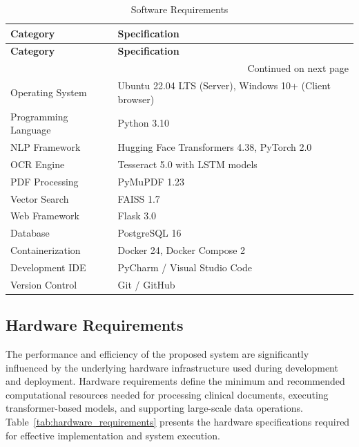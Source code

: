 \begin{longtable}{|p{4.5cm}|p{9cm}|}
\caption{Software Requirements}
\label{tab:software_requirements}\\

\hline
\textbf{Category} &
\textbf{Specification} \\
\hline
\endfirsthead

\hline
\textbf{Category} &
\textbf{Specification} \\
\hline
\endhead

\hline
\multicolumn{2}{r}{Continued on next page} \\
\endfoot

\hline
\endlastfoot


Operating System &
Ubuntu 22.04 LTS (Server), Windows 10+ (Client browser) \\
\hline

Programming Language &
Python 3.10 \\
\hline

NLP Framework &
Hugging Face Transformers 4.38, PyTorch 2.0 \\
\hline

OCR Engine &
Tesseract 5.0 with LSTM models \\
\hline

PDF Processing &
PyMuPDF 1.23 \\
\hline

Vector Search &
FAISS 1.7 \\
\hline

Web Framework &
Flask 3.0 \\
\hline

Database &
PostgreSQL 16 \\
\hline

Containerization &
Docker 24, Docker Compose 2 \\
\hline

Development IDE &
PyCharm / Visual Studio Code \\
\hline

Version Control &
Git / GitHub \\
\hline

\end{longtable}

\subsection{Hardware Requirements}
The performance and efficiency of the proposed system are significantly influenced by the underlying hardware infrastructure used during development and deployment. Hardware requirements define the minimum and recommended computational resources needed for processing clinical documents, executing transformer-based models, and supporting large-scale data operations. Table~\ref{tab:hardware_requirements} presents the hardware specifications required for effective implementation and system execution.

